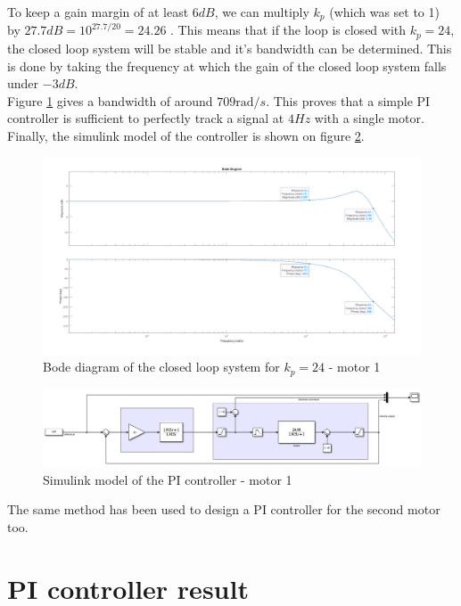 To keep a gain margin of at least $6 dB$, we can multiply $k_p$ (which was set to 1) by $27.7 dB = 10^{27.7/20} = 24.26$
. This means that if the loop is closed with $k_p = 24$, the closed loop system will be stable and it's bandwidth can
be determined. This is done by taking the frequency at which the gain of the closed loop system falls under $-3 dB$.\\ 
Figure \ref{fig:CL bode} gives a bandwidth of around $709 \text{rad}/s$.  This proves that a simple PI controller is 
sufficient to perfectly track a signal at $4 Hz$ with a single motor. Finally, the simulink model of the controller is shown on figure \ref{fig:simulink single PI}.

\begin{figure}
    \centering
    \includegraphics[width=\textwidth]{Pictures/bode_CL.png}
    \caption{Bode diagram of the closed loop system for $k_p = 24$ - motor 1}
    \label{fig:CL bode}
\end{figure}

\begin{figure}
    \centering
    \includegraphics[width=\textwidth]{Pictures/single_PI_simulink.png}
    \caption{Simulink model of the PI controller - motor 1}
    \label{fig:simulink single PI}
\end{figure}


The same method has been used to design a PI controller for the second motor too.

\section{PI controller result}
\label{section:PI controller result}

